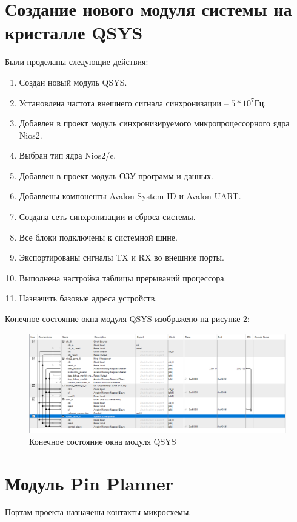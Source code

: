 \section*{Создание нового модуля системы на кристалле QSYS}
Были проделаны следующие действия:
\begin{enumerate}
	\item Создан новый модуль QSYS.
	\item Установлена частота внешнего сигнала синхронизации -- $5 * 10^7 Гц$.
	\item Добавлен в проект модуль синхронизируемого микропроцессорного ядра Nios2.
	\item Выбран тип ядра Nios2/e.
	\item Добавлен в проект модуль ОЗУ программ и данных.
	\item Добавлены компоненты Avalon System ID и Avalon UART.
	\item Создана сеть синхронизации и сброса системы.
	\item Все блоки подключены к системной шине.
	\item Экспортированы сигналы TX и RX во внешние порты.
	\item Выполнена настройка таблицы прерываний процессора.
	\item Назначить базовые адреса устройств.
\end{enumerate}

Конечное состояние окна модуля QSYS изображено на рисунке 2:

\FloatBarrier
\begin{figure}[h]
	\begin{center}
		\includegraphics[width=\linewidth]{inc/qsys.png}
	\end{center}
	\caption{Конечное состояние окна модуля QSYS}
\end{figure}
\FloatBarrier

\section*{Модуль Pin Planner}
Портам проекта назначены контакты микросхемы.

